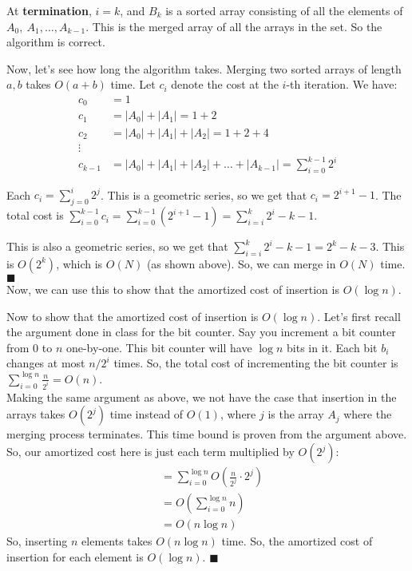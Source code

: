 \documentclass[a4paper]{article}
\begin{document}
\begin{enumerate}
    At \textbf{termination}, $i=k$, and $B_k$ is a sorted array consisting of all the elements of $A_0,\  A_1, \dots, A_{k-1}$. This is the merged array of all the arrays in the set. So the algorithm is correct.

    Now, let's see how long the algorithm takes. Merging two sorted arrays of length $a, b$ takes $O(a+b)$ time. Let $c_i$ denote the cost at the $i$-th iteration. We have:
    \begin{align*}
        c_0 &= 1\\
        c_1 &= |A_0| + |A_1| = 1 + 2\\
        c_2 &= |A_0| + |A_1| + |A_2| = 1 + 2 + 4\\
        \vdots\\
        c_{k-1} &= |A_0| + |A_1| + |A_2| + \dots + |A_{k-1}| = \sum_{i=0}^{k-1} 2^i
    \end{align*}
    
    Each $c_i = \sum_{j=0}^{i} 2^j$. This is a geometric series, so we get that $c_i = 2^{i+1} - 1$. The total cost is $\sum_{i=0}^{k-1} c_i = \sum_{i=0}^{k-1} (2^{i+1} - 1) = \sum_{i=i}^{k} 2^i - k -1$.

    This is also a geometric series, so we get that $\sum_{i=i}^{k} 2^i - k -1 = 2^k - k - 3$. This is $O(2^k)$, which is $O(N)$ (as shown above). So, we can merge in $O(N)$ time. $\blacksquare$\\

    Now, we can use this to show that the amortized cost of insertion is $O(\log n)$.

    \newpage

    Now to show that the amortized cost of insertion is $O(\log n)$. Let's first recall the argument done in class for the bit counter. Say you increment a bit counter from $0$ to $n$ one-by-one. This bit counter will have $\log n$ bits in it. Each bit $b_i$ changes at most $n / 2^i$ times. So, the total cost of incrementing the bit counter is $\sum_{i=0}^{\log n} \frac{n}{2^i} = O(n)$.\\

    Making the same argument as above, we not have the case that insertion in the arrays takes $O(2^j)$ time instead of $O(1)$, where $j$ is the array $A_j$ where the merging process terminates. This time bound is proven from the argument above.\\

    So, our amortized cost here is just each term multiplied by $O(2^j)$:
    \begin{align*}
        &= \sum_{i=0}^{\log n} O(\frac{n}{2^j} \cdot 2^j)\\
        &= O(\sum_{i=0}^{\log n} n)\\
        &= O(n\log n)
    \end{align*}
    So, inserting $n$ elements takes $O(n\log n)$ time. So, the amortized cost of insertion for each element is $O(\log n)$. $\blacksquare$\\


\end{enumerate}
\end{document}
